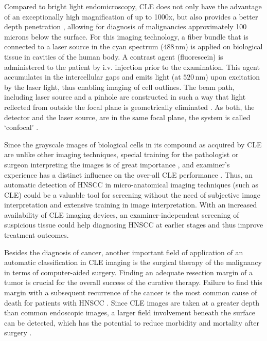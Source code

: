 \documentclass[fleqn,10pt]{wlscirep}
\begin{document}
Compared to bright light endomicroscopy, CLE does not only have the
advantage of an exceptionally high magnification of up to
1000x\cite{Oetter:2016cp}, but also provides a better depth
penetration \cite{Helmchen:2002vt}, allowing for diagnosis of
  malignancies approximately 100 microns below the surface.  For this imaging technology, a 
fiber bundle that is connected to a laser source in the cyan spectrum ($488\,$nm) is
applied on biological tissue in cavities of the human body. A contrast agent (fluorescein) is administered
to the patient by i.v. injection prior to the examination. This agent accumulates in
the intercellular gaps and emits light (at $520\,$nm) upon excitation by the laser light, thus enabling 
imaging of cell outlines. The beam path, including laser source and a pinhole are
constructed in such a way that light reflected from outside the focal
plane is geometrically eliminated \cite{SCA:SCA4950100403,Abbaci:2014wn}. As both, the detector and the laser source,
are in the same focal plane, the system is called `confocal' \cite{Hoffman:2006ei}.

Since the grayscale images of biological cells in its compound as acquired by CLE are unlike other imaging
techniques, special training for the pathologist or surgeon
interpreting the images is of great importance \cite{Abbaci:2014wn},
and examiner's experience has a distinct influence on the over-all CLE
performance \cite{Neumann:2011tc}. Thus, an automatic detection of
HNSCC in micro-anatomical imaging techniques (such as CLE) could be a valuable tool for screening without
the need of subjective image interpretation and extensive training in image interpretation. With an
increased availability of CLE imaging devices, an examiner-independent screening  of
suspicious tissue could help diagnosing HNSCC at earlier stages and
thus improve treatment outcomes.

Besides the diagnosis of cancer, another important field of application of an automatic classification in CLE imaging is the surgical therapy of the malignancy in terms of computer-aided surgery. Finding an adequate resection margin of a
tumor is crucial for the overall success of the curative
therapy. Failure to find this margin with a subsequent recurrence of the cancer is the most common cause of
death for patients with HNSCC \cite{Nathan:2014ky}. Since CLE images
are taken at a greater depth than common endoscopic images, a larger
field involvement beneath the surface can be detected, which has the
potential to reduce morbidity and mortality after surgery \cite{Nathan:2014ky}. 
\end{document}
